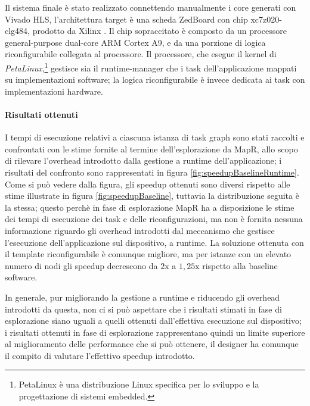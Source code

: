 Il sistema finale \`e stato realizzato connettendo manualmente i core generati con Vivado HLS,
l'architettura target \`e una scheda ZedBoard con chip xc7z020-clg484, prodotto da Xilinx
\cite{XilinxZC702}. Il chip sopraccitato \`e composto da un processore general-purpose dual-core
ARM Cortex A9, e da una porzione di logica riconfigurabile collegata al processore.
Il processore, che esegue il kernel di \emph{PetaLinux},\footnote{PetaLinux \`e una distribuzione
Linux specifica per lo sviluppo e la progettazione di sistemi embedded.} gestisce
sia il runtime-manager che i task dell'applicazione mappati su implementazioni software;
la logica riconfigurabile \`e invece dedicata ai task con implementazioni hardware.

\paragraph{Risultati ottenuti}
I tempi di esecuzione relativi a ciascuna istanza di task graph sono stati raccolti e confrontati
con le stime fornite al termine dell'esplorazione da MapR, allo scopo di rilevare l'overhead
introdotto dalla gestione a runtime dell'applicazione; i risultati del confronto sono
rappresentati in figura \ref{fig:speedupBaselineRuntime}.
Come si pu\`o vedere dalla figura, gli speedup ottenuti sono diversi rispetto alle stime
illustrate in figura \ref{fig:speedupBaseline}, tuttavia la distribuzione seguita \`e la stessa;
questo perch\`e in fase di esplorazione MapR ha a disposizione le stime dei tempi di esecuzione
dei task e delle riconfigurazioni, ma non \`e fornita nessuna informazione riguardo gli overhead
introdotti dal meccanismo che gestisce l'esecuzione dell'applicazione sul dispositivo, a runtime.
La soluzione ottenuta con il template riconfigurabile \`e comunque migliore, ma per istanze
con un elevato numero di nodi gli speedup decrescono da $2\text{x}$ a $1,25\text{x}$ rispetto alla
baseline software.

In generale, pur migliorando la gestione a runtime e riducendo gli overhead introdotti da questa,
non ci si pu\`o aspettare che i risultati stimati in fase di esplorazione siano uguali a quelli ottenuti
dall'effettiva esecuzione sul dispositivo; i risultati ottenuti in fase di esplorazione rappresentano quindi
un limite superiore al miglioramento delle performance che si pu\`o ottenere, il designer ha comunque il compito
di valutare l'effettivo speedup introdotto.

